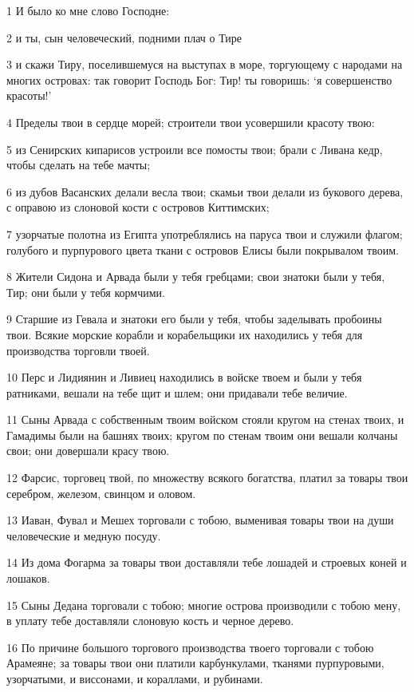 \par 1 И было ко мне слово Господне:
\par 2 и ты, сын человеческий, подними плач о Тире
\par 3 и скажи Тиру, поселившемуся на выступах в море, торгующему с народами на многих островах: так говорит Господь Бог: Тир! ты говоришь: `я совершенство красоты!'
\par 4 Пределы твои в сердце морей; строители твои усовершили красоту твою:
\par 5 из Сенирских кипарисов устроили все помосты твои; брали с Ливана кедр, чтобы сделать на тебе мачты;
\par 6 из дубов Васанских делали весла твои; скамьи твои делали из букового дерева, с оправою из слоновой кости с островов Киттимских;
\par 7 узорчатые полотна из Египта употреблялись на паруса твои и служили флагом; голубого и пурпурового цвета ткани с островов Елисы были покрывалом твоим.
\par 8 Жители Сидона и Арвада были у тебя гребцами; свои знатоки были у тебя, Тир; они были у тебя кормчими.
\par 9 Старшие из Гевала и знатоки его были у тебя, чтобы заделывать пробоины твои. Всякие морские корабли и корабельщики их находились у тебя для производства торговли твоей.
\par 10 Перс и Лидиянин и Ливиец находились в войске твоем и были у тебя ратниками, вешали на тебе щит и шлем; они придавали тебе величие.
\par 11 Сыны Арвада с собственным твоим войском стояли кругом на стенах твоих, и Гамадимы были на башнях твоих; кругом по стенам твоим они вешали колчаны свои; они довершали красу твою.
\par 12 Фарсис, торговец твой, по множеству всякого богатства, платил за товары твои серебром, железом, свинцом и оловом.
\par 13 Иаван, Фувал и Мешех торговали с тобою, выменивая товары твои на души человеческие и медную посуду.
\par 14 Из дома Фогарма за товары твои доставляли тебе лошадей и строевых коней и лошаков.
\par 15 Сыны Дедана торговали с тобою; многие острова производили с тобою мену, в уплату тебе доставляли слоновую кость и черное дерево.
\par 16 По причине большого торгового производства твоего торговали с тобою Арамеяне; за товары твои они платили карбункулами, тканями пурпуровыми, узорчатыми, и виссонами, и кораллами, и рубинами.
